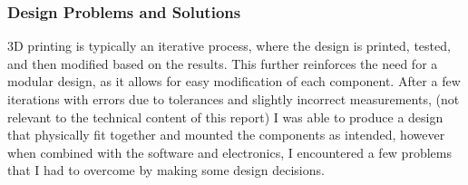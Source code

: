 \subsubsection{Design Problems and Solutions}
3D printing is typically an iterative process, where the design is printed, tested, and then modified based on the results.
This further reinforces the need for a modular design, as it allows for easy modification of each component.
After a few iterations with errors due to tolerances and slightly incorrect measurements, (not relevant to the technical content of this report)
I was able to produce a design that physically fit together and mounted the components as intended, however when combined with the software
and electronics, I encountered a few problems that I had to overcome by making some design decisions.

